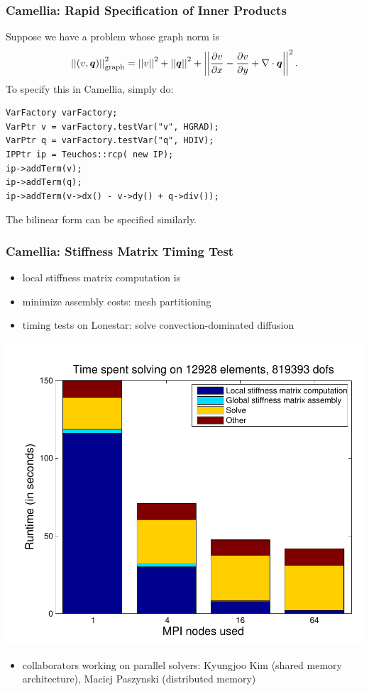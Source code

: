 \documentclass[mathserif]{beamer}
\newcommand{\vect}[1]{\ensuremath\boldsymbol{#1}}
\newcommand{\NVRnorm}[1]{\left|\left|#1\right|\right|}
\newcommand{\NVRgrad}{\nabla}
\newcommand{\NVRdiv}{\NVRgrad \cdot}
\newcommand{\NVRpd}[2]{\frac{\partial#1}{\partial#2}}
\newcommand{\pecosbold}[1]{{\color{pecos2}{#1}}}
\begin{document}
\begin{frame}[fragile]
\frametitle{Camellia: Rapid Specification of Inner Products}
Suppose we have a problem whose graph norm is
\[
\NVRnorm{(v,\vect{q})}_{\rm graph}^{2} = \NVRnorm{v}^{2} + \NVRnorm{\vect{q}}^{2} + \NVRnorm{\NVRpd{v}{x} - \NVRpd{v}{y} + \NVRdiv \vect{q}}^{2}.
\]
\vspace{2mm}
To specify this in Camellia, simply do:
\begin{lstlisting}
VarFactory varFactory;
VarPtr v = varFactory.testVar("v", HGRAD);
VarPtr q = varFactory.testVar("q", HDIV);
IPPtr ip = Teuchos::rcp( new IP);
ip->addTerm(v);
ip->addTerm(q);
ip->addTerm(v->dx() - v->dy() + q->div());
\end{lstlisting}

The bilinear form can be specified similarly.

\end{frame}

\begin{frame}
\frametitle{Camellia: Stiffness Matrix Timing Test}
\begin{itemize}
\item local stiffness matrix computation is \pecosbold{embarrassingly parallel}
\item minimize assembly costs: \pecosbold{spatially local} mesh partitioning
\item timing tests on Lonestar: solve convection-dominated diffusion
\end{itemize}
\vspace{-5mm}
\begin{center}
\includegraphics[scale = 0.40]{../figs/scalingFigs/bar_ref3.pdf}\hspace{1cm}
\end{center}
\begin{itemize}
\vspace{-5mm}
\item collaborators working on parallel solvers: Kyungjoo Kim (shared memory architecture),  Maciej Paszynski (distributed memory)
\end{itemize}

\end{frame}
\end{document}
